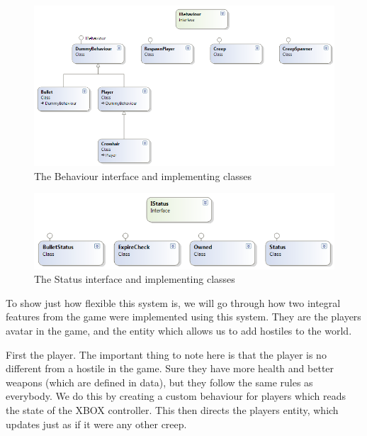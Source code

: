 \begin{figure}
    \begin{center}
    \includegraphics[width=\linewidth]{graphics/behaviours}
    \caption{The Behaviour interface and implementing classes}
    \label{fig:behaviours}
    \end{center}
\end{figure}

\begin{figure}
    \begin{center}
    \includegraphics[width=\linewidth]{graphics/statuses}
    \caption{The Status interface and implementing classes}
    \label{fig:statuses}
    \end{center}
\end{figure}

To show just how flexible this system is, we will go through how two integral
features from the game were implemented using this system. They are the players
avatar in the game, and the entity which allows us to add hostiles to the 
world.

First the player. The important thing to note here is that the player is no
different from a hostile in the game. Sure they have more health and better
weapons (which are defined in data), but they follow the same rules as 
everybody. We do this by creating a custom behaviour for players which reads 
the state of the XBOX controller. This then directs the players entity, which
updates just as if it were any other creep.

